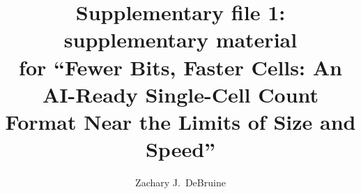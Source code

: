 \documentclass[10pt,letterpaper]{article}
\title{Supplementary file 1: supplementary material\\[2pt]
\large for ``Fewer Bits, Faster Cells: An AI-Ready Single-Cell Count Format Near the Limits of Size and Speed''}
\author{Zachary J.\ DeBruine}
\date{}
\begin{document}
\maketitle




\FloatBarrier


\clearpage




\end{document}
